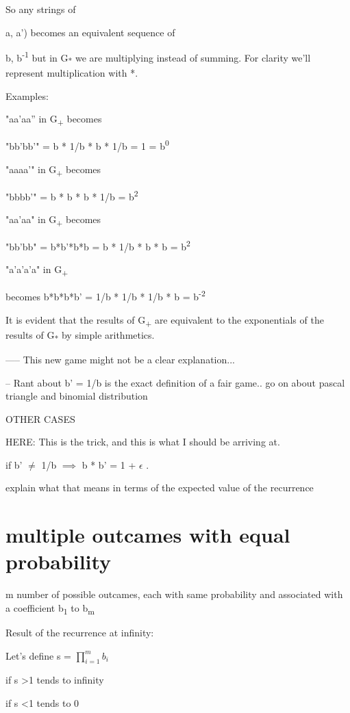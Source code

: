 \documentclass[12pt,reqno]{amsart}
\begin{document}
So any strings of {a, a') becomes an equivalent sequence of {b, b\textsuperscript{-1} but in G\textsubscript{*} we are multiplying instead of summing. For clarity we'll represent multiplication with *.

Examples: 

"aa'aa'' in G\textsubscript{+} becomes

"bb'bb'" = b * 1/b * b * 1/b = 1 = b\textsuperscript{0}

"aaaa'" in G\textsubscript{+} becomes

"bbbb'" = b * b * b * 1/b = b\textsuperscript{2}

"aa'aa" in G\textsubscript{+} becomes

"bb'bb" = b*b'*b*b = b * 1/b * b * b = b\textsuperscript{2}

"a'a'a'a" in G\textsubscript{+}

becomes b*b*b*b' = 1/b * 1/b * 1/b * b = b\textsuperscript{-2}

It is evident that the results of G\textsubscript{+} are equivalent to the 
exponentials of the results of G\textsubscript{*} by simple arithmetics.

----- This new game might not be a clear explanation... 

-- Rant about b' = 1/b is the exact definition of a fair game.. go on about pascal triangle and binomial distribution


OTHER CASES

HERE: This is the trick, and this is what I should be arriving at.

if b' $\neq$ 1/b  $\implies$  b * b' = 1 + $\epsilon$ .

explain what that means in terms of the expected value of the recurrence


\section{multiple outcames with equal probability}

m number of possible outcames, each with same probability and associated with a coefficient b\textsubscript{1} to b\textsubscript{m}



Result of the recurrence at infinity:



Let's define s = $\prod_{i=1}^{m} b_{i}$

if s \textgreater 1 tends to infinity

if s \textless 1 tends to 0

}}
\end{document}
